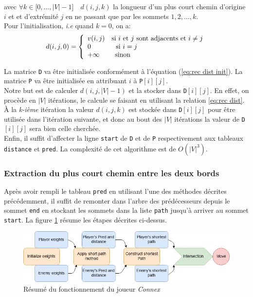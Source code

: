 \documentclass[a4paper, 12pt]{article}
\begin{document}
avec $\forall k\in[{0,\ldots,|V|-1]}\quad d(i,j,k)$ la longueur d'un plus court chemin d'origine $i$ et et d'extrémité $j$ en ne passant que par les sommets $1,2,\ldots,k$.\\
Pour l'initialisation, \emph{i.e} quand $k=0$, on a:\\

\begin{equation}
  d(i,j,0) = \left\{
    \begin{array}{ll}
      v(i,j) \quad \text{si $i$ et $j$ sont adjacents et $i\ne j$}\\
      0 \hspace{1.3cm} \text{si $i=j$}\\
      +\infty \hspace{.8cm} \text{sinon}
    \end{array}
  \right.
  \label{eq:rec dist init}
\end{equation}

La matrice \texttt{D} va être initialisée conformément à l'équation (\ref{eq:rec dist init}). La matrice \texttt{P} va être initialisée en attribuant $i$ à \texttt{P}$[i][j]$.\\
Notre but est de calculer $d(i,j,|V|-1)$ et la stocker dans \texttt{D}$[i][j]$. En effet, on procède en $|V|$ itérations, le calcule se faisant en utilisant la relation \eqref{eq:rec dist}. À la \emph{k-i\`eme} itération la valeur $d(i,j,k)$ est stockée dans \texttt{D}$[i][j]$ pour être utilisée dans l'itération suivante, et donc au bout des $|V|$ itérations la valeur de \texttt{D}$[i][j]$ sera bien celle cherchée.\\
Enfin, il suffit d'affecter la ligne \texttt{start} de \texttt{D} et de \texttt{P} respectivement aux tableaux \texttt{distance} et \texttt{pred}. La complexité de cet algorithme est de $O(|V|^3)$.

\subsubsection{Extraction du plus court chemin entre les deux bords}
Après avoir rempli le tableau \texttt{pred} en utilisant l'une des méthodes décrites précédemment, il suffit de remonter dans l'arbre des prédécesseurs depuis le sommet \texttt{end} en stockant les sommets dans la liste \texttt{path} jusqu'à arriver au sommet \texttt{start}. La figure \ref{fig:connex res} résume les étapes décrites ci-dessus.

\begin{figure}[h!]
  \centering
  \includegraphics[width=.8\linewidth]{./pictures/Resume_connex.PNG}
  \caption{Résumé du fonctionnement du joueur \emph{Connex}}
  \label{fig:connex res}
\end{figure}
\end{document}
